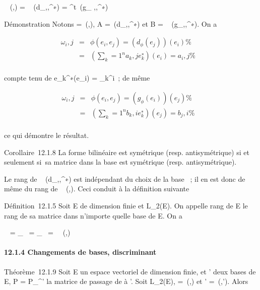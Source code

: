\documentclass[]{article}
\begin{document}
\mathrmMat~ (\phi,)
= \mathrmMat~
(d_\phi,,^∗) = ^t\
\mathrmMat (g_ \phi,,^∗)

Démonstration Notons \Omega =\
\mathrmMat (\phi,), A =\
\mathrmMat (d_\phi,,^∗) et B
= \mathrmMat~
(g_\phi,\mathcal{E},\mathcal{E}^∗). On a

\begin{align*} \omega_i,j& =&
\phi(e_i,e_j) = \left
(d_\phi(e_j)\right )(e_i) \%&
\\ & =& \left
(\sum _k=1^na_
k,je_k^∗\right )(e_ i) =
a_i,j\%& \\
\end{align*}

compte tenu de e_k^∗(e_i) =
\delta_k^i~; de même

\begin{align*} \omega_i,j& =&
\phi(e_i,e_j) = \left
(g_\phi(e_i)\right )(e_j) \%&
\\ & =& \left
(\sum _k=1^nb_
k,ie_k^∗\right )(e_ j) =
b_j,i\%& \\
\end{align*}

ce qui démontre le résultat.

Corollaire~12.1.8 La forme bilinéaire \phi est symétrique (resp.
antisymétrique) si et seulement si~sa matrice dans la base  est
symétrique (resp. antisymétrique).

Le rang de \mathrmMat~
(d_\phi,,^∗) est indépendant du choix de la base \mathcal{E}~;
il en est donc de même du rang de
\mathrmMat~ (\phi,\mathcal{E}). Ceci
conduit à la définition suivante

Définition~12.1.5 Soit E de dimension finie et \phi \in L_2(E). On
appelle rang de E le rang de sa matrice dans n'importe quelle base de E.
On a

\mathrmrg~\phi
= \mathrmrgd_\phi~
= \mathrmrgg_\phi~
=\
\mathrmrg\mathrmMat~
(\phi,)

\paragraph{12.1.4 Changements de bases, discriminant}

Théorème~12.1.9 Soit E un espace vectoriel de dimension finie,  et '
deux bases de E, P = P_^' la matrice de passage de  à
\mathcal{E}'. Soit \phi \in L_2(E), \Omega =\
\mathrmMat (\phi,) et \Omega' =\
\mathrmMat (\phi,'). Alors
\end{document}
